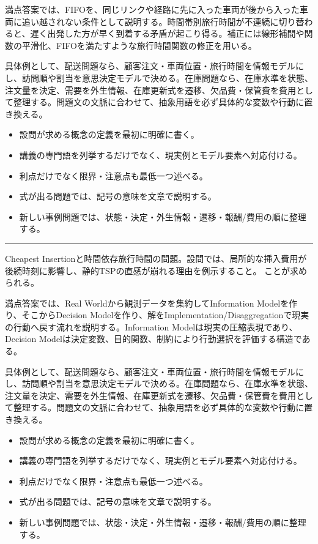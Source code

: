 満点答案では、FIFOを、同じリンクや経路に先に入った車両が後から入った車両に追い越されない条件として説明する。時間帯別旅行時間が不連続に切り替わると、遅く出発した方が早く到着する矛盾が起こり得る。補正には線形補間や関数の平滑化、FIFOを満たすような旅行時間関数の修正を用いる。\par
{}
具体例として、配送問題なら、顧客注文・車両位置・旅行時間を情報モデルにし、訪問順や割当を意思決定モデルで決める。在庫問題なら、在庫水準を状態、注文量を決定、需要を外生情報、在庫更新式を遷移、欠品費・保管費を費用として整理する。問題文の文脈に合わせて、抽象用語を必ず具体的な変数や行動に置き換える。\par
{}
\begin{itemize}
\item 設問が求める概念の定義を最初に明確に書く。
\item 講義の専門語を列挙するだけでなく、現実例とモデル要素へ対応付ける。
\item 利点だけでなく限界・注意点も最低一つ述べる。
\item 式が出る問題では、記号の意味を文章で説明する。
\item 新しい事例問題では、状態・決定・外生情報・遷移・報酬/費用の順に整理する。
\end{itemize}
\vspace{2mm}\hrule\vspace{2mm}
Cheapest Insertionと時間依存旅行時間の問題。設問では、局所的な挿入費用が後続時刻に影響し、静的TSPの直感が崩れる理由を例示すること。 ことが求められる。\par
{}
満点答案では、Real Worldから観測データを集約してInformation Modelを作り、そこからDecision Modelを作り、解をImplementation/Disaggregationで現実の行動へ戻す流れを説明する。Information Modelは現実の圧縮表現であり、Decision Modelは決定変数、目的関数、制約により行動選択を評価する構造である。\par
{}
具体例として、配送問題なら、顧客注文・車両位置・旅行時間を情報モデルにし、訪問順や割当を意思決定モデルで決める。在庫問題なら、在庫水準を状態、注文量を決定、需要を外生情報、在庫更新式を遷移、欠品費・保管費を費用として整理する。問題文の文脈に合わせて、抽象用語を必ず具体的な変数や行動に置き換える。\par
{}
\begin{itemize}
\item 設問が求める概念の定義を最初に明確に書く。
\item 講義の専門語を列挙するだけでなく、現実例とモデル要素へ対応付ける。
\item 利点だけでなく限界・注意点も最低一つ述べる。
\item 式が出る問題では、記号の意味を文章で説明する。
\item 新しい事例問題では、状態・決定・外生情報・遷移・報酬/費用の順に整理する。
\end{itemize}
